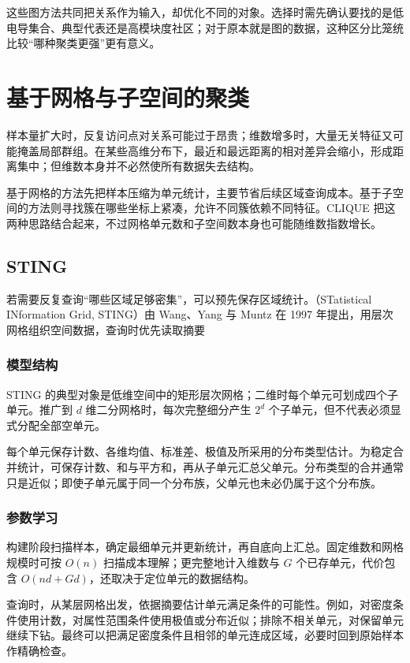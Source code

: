 这些图方法共同把关系作为输入，却优化不同的对象。选择时需先确认要找的是低电导集合、典型代表还是高模块度社区；对于原本就是图的数据，这种区分比笼统比较“哪种聚类更强”更有意义。

\section{基于网格与子空间的聚类}
\label{sec:clustering-subspace}

样本量扩大时，反复访问点对关系可能过于昂贵；维数增多时，大量无关特征又可能掩盖局部群组。在某些高维分布下，最近和最远距离的相对差异会缩小，形成距离集中；但维数本身并不必然使所有数据失去结构。

基于网格的方法先把样本压缩为单元统计，主要节省后续区域查询成本。基于子空间的方法则寻找簇在哪些坐标上紧凑，允许不同簇依赖不同特征。CLIQUE 把这两种思路结合起来，不过网格单元数和子空间数本身也可能随维数指数增长。

\subsection{STING}

若需要反复查询“哪些区域足够密集”，可以预先保存区域统计。（STatistical INformation Grid, STING）由 Wang、Yang 与 Muntz 在 1997 年提出，用层次网格组织空间数据，查询时优先读取摘要

\subsubsection{模型结构}

STING 的典型对象是低维空间中的矩形层次网格；二维时每个单元可划成四个子单元。推广到 $d$ 维二分网格时，每次完整细分产生 $2^d$ 个子单元，但不代表必须显式分配全部空单元。

每个单元保存计数、各维均值、标准差、极值及所采用的分布类型估计。为稳定合并统计，可保存计数、和与平方和，再从子单元汇总父单元。分布类型的合并通常只是近似；即使子单元属于同一个分布族，父单元也未必仍属于这个分布族。

\subsubsection{参数学习}

构建阶段扫描样本，确定最细单元并更新统计，再自底向上汇总。固定维数和网格规模时可按 $O(n)$ 扫描成本理解；更完整地计入维数与 $G$ 个已存单元，代价包含 $O(nd+Gd)$，还取决于定位单元的数据结构。

查询时，从某层网格出发，依据摘要估计单元满足条件的可能性。例如，对密度条件使用计数，对属性范围条件使用极值或分布近似；排除不相关单元，对保留单元继续下钻。最终可以把满足密度条件且相邻的单元连成区域，必要时回到原始样本作精确检查。


